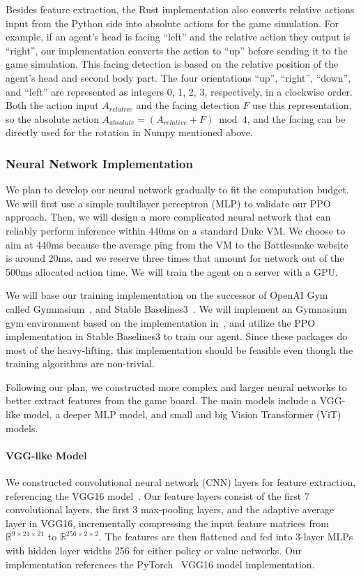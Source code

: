 \documentclass[conference]{IEEEtran}
\begin{document}
Besides feature extraction,
the Rust implementation also converts relative actions input from the Python
side into absolute actions for the game simulation. For example,
if an agent's head is facing ``left'' and the relative action they output is
``right'',
our implementation converts the action to ``up'' before sending it to the game
simulation.
This facing detection is based on the relative position of the agent's head and
second body part. The four orientations ``up'', ``right'', ``down'',
and ``left'' are represented as integers 0, 1, 2, 3, respectively,
in a clockwise order.
Both the action input $A_{relative}$ and the facing detection $F$ use this
representation, so the absolute action $A_{absolute}=(A_{relative}+F)\bmod 4$,
and the facing can be directly used for the rotation in Numpy mentioned above.

\subsubsection{Neural Network Implementation}

We plan to develop our neural network gradually to fit the computation budget.
We will first use a simple multilayer perceptron (MLP)
to validate our PPO approach. Then,
we will design a more complicated neural network that can reliably perform
inference within 440ms on a standard Duke VM.
We choose to aim at 440ms because the average ping from the VM to the
Battlesnake website is around 20ms,
and we reserve three times that amount for network out of the 500ms allocated
action time. We will train the agent on a server with a GPU.

We will base our training implementation on the successor of OpenAI
Gym~\cite{brockman2016openai} called Gymnasium~\cite{farama2024gymnasium},
and Stable Baselines3~\cite{raffin2024stable}.
We will implement an Gymnasium gym environment based on the implementation
in~\cite{chung2020battlesnake},
and utilize the PPO implementation in Stable Baselines3 to train our agent.
Since these packages do most of the heavy-lifting,
this implementation should be feasible even though the training algorithms are
non-trivial.

Following our plan,
we constructed more complex and larger neural networks to better extract
features from the game board. The main models include a VGG-like model,
a deeper MLP model, and small and big Vision Transformer (ViT) models.

\paragraph{VGG-like Model}
We constructed convolutional neural network (CNN) layers for feature extraction,
referencing the VGG16 model~\cite{simonyan2014very}.
Our feature layers consist of the first 7 convolutional layers,
the first 3 max-pooling layers, and the adaptive average layer in VGG16,
incrementally compressing the input feature matrices from $\mathbb R^{9\times
            21\times 21}$ to $\mathbb R^{256\times 2\times 2}$.
The features are then flattened and fed into 3-layer MLPs with hidden layer
widths 256 for either policy or value networks.
Our implementation references the PyTorch~\cite{paszke2019pytorch}
VGG16 model implementation.
\end{document}
